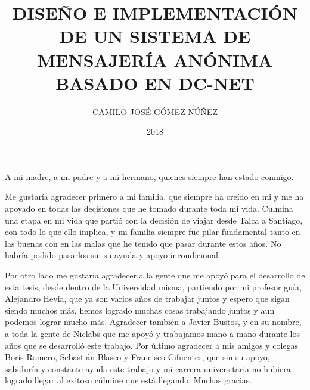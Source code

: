 \documentclass[upright, contnum]{umemoria}
\author{CAMILO JOSÉ GÓMEZ NÚÑEZ}
\title{DISEÑO E IMPLEMENTACIÓN DE UN SISTEMA DE MENSAJERÍA ANÓNIMA BASADO EN DC-NET}
\date{2018}
\begin{document}
\frontmatter
\maketitle

\begin{abstract}

\end{abstract}

\begin{dedicatoria} %
A mi madre, a mi padre y a mi hermano, quienes siempre han estado conmigo.
\end{dedicatoria}

\begin{thanks} %
Me gustaría agradecer primero a mi familia, que siempre ha creído 
en mi y me ha apoyado en todas las decisiones que he tomado durante 
toda mi vida. Culmina una etapa en mi vida que partió con la decisión 
de viajar desde Talca a Santiago, con todo lo que ello implica, y mi 
familia siempre fue pilar fundamental tanto en las buenas con en las 
malas que he tenido que pasar durante estos años. No habría podido 
pasarlos sin su ayuda y apoyo incondicional.

Por otro lado me gustaría agradecer a la gente que me apoyó para el 
desarrollo de esta tesis, desde dentro de la Universidad misma, partiendo 
por mi profesor guía, Alejandro Hevia, que ya son varios años de trabajar 
juntos y espero que sigan siendo muchos más, hemos logrado muchas 
cosas trabajando juntos y aun podemos lograr mucho más. Agradecer también 
a Javier Bustos, y en su nombre, a toda la gente de Niclabs que me apoyó 
y trabajamos mano a mano durante los años que se desarrolló este trabajo. Por 
último agradecer a mis amigos y colegas Boris Romero, Sebastián Blasco y 
Francisco Cifuentes, que sin su apoyo, sabiduría y constante ayuda este 
trabajo y mi carrera universitaria no hubiera logrado llegar al exitoso 
cúlmine que está llegando. Muchas gracias.
\end{thanks}
\cleardoublepage

\tableofcontents

\mainmatter













\end{document}
